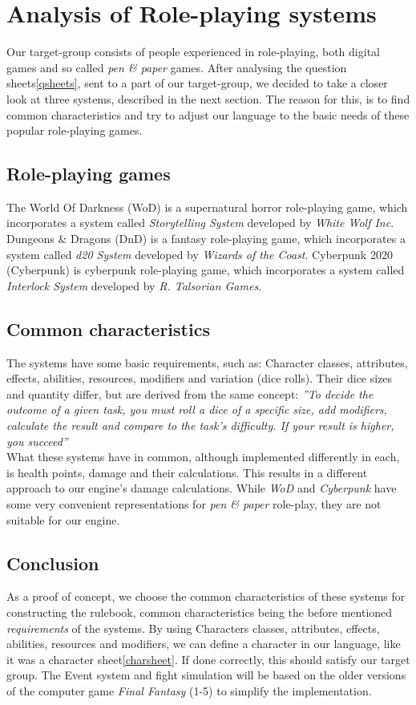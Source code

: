 \section{Analysis of Role-playing systems}
Our target-group consists of people experienced in role-playing, both digital games and so called \emph{pen \& paper} games.	After analysing the question sheets\vref{qsheets}, sent to a part of our target-group, we decided to take a closer look at three systems, described in the next section. The reason for this, is to find common characteristics and try to adjust our language to the basic needs of these popular role-playing games.

\subsection*{Role-playing games}
The World Of Darkness (WoD) is a supernatural horror role-playing game, which incorporates a system called \emph{Storytelling System} developed by \emph{White Wolf Inc}.\cite{wod}
Dungeons \& Dragons (DnD) is a fantasy role-playing game, which incorporates a system called \emph{d20 System} developed by \emph{Wizards of the Coast}.\cite{dnd}
Cyberpunk 2020 (Cyberpunk) is cyberpunk role-playing game, which incorporates a system called \emph{Interlock System} developed by \emph{R. Talsorian Games}.\cite{cyberpunk}

\subsection*{Common characteristics}
The systems have some basic requirements, such as:
Character classes, attributes, effects, abilities, resources, modifiers and variation (dice rolls).
Their dice sizes and quantity differ, but are derived from the same concept: \textit{''To decide the outcome of a given task, you must roll a dice of a specific size, add modifiers, calculate the result and compare to the task's difficulty. If your result is higher, you succeed''}\\

What these systems have in common, although implemented differently in each, is health points, damage and their calculations. This results in a different approach to our engine's damage calculations. While \emph{WoD} and \emph{Cyberpunk} have some very convenient representations for \emph{pen \& paper} role-play, they are not suitable for our engine.

\subsection*{Conclusion}
As a proof of concept, we choose the common characteristics of these systems for constructing the rulebook, common characteristics being the before mentioned \emph{requirements} of the systems.
By using Characters classes, attributes, effects, abilities, resources and modifiers, we can define a character in our language, like it was a character sheet\vref{charsheet}. If done correctly, this should satisfy our target group.
The Event system and fight simulation will be based on the older versions of the computer game \emph{Final Fantasy} (1-5) to simplify the implementation.

